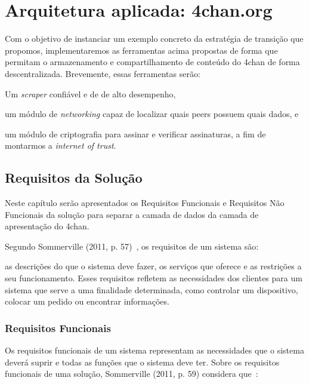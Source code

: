 
\chapter{Arquitetura aplicada: 4chan.org}

Com o objetivo de instanciar um exemplo concreto da estratégia de transição que propomos, implementaremos as ferramentas acima propostas de forma que permitam o armazenamento e compartilhamento de conteúdo do 4chan de forma descentralizada.
Brevemente, essas ferramentas serão:
\begin{enumerate*}[label=(\arabic*)]
    \item Um \textit{scraper} confiável e de de alto desempenho,
    \item um módulo de \textit{networking} capaz de localizar quais peers possuem quais dados, e
    \item um módulo de criptografia para assinar e verificar assinaturas, a fim de montarmos a \textit{internet of trust}. 
\end{enumerate*}

\section{Requisitos da Solução}

Neste capítulo serão apresentados os Requisitos Funcionais e Requisitos Não Funcionais da solução para separar a camada de dados da camada de apresentação do 4chan.

Segundo Sommerville (2011, p. 57)~\cite{SOMMERVILLE1}, os requisitos de um sistema são:

\begin{directcite}
as descrições do que o sistema deve fazer, os serviços que
oferece e as restrições a seu funcionamento.
Esses requisitos refletem as necessidades dos clientes para
um sistema que serve a uma finalidade determinada, como controlar
um dispositivo, colocar um pedido ou encontrar informações.
\end{directcite}

\subsection{Requisitos Funcionais}

Os requisitos funcionais de um sistema representam as necessidades que o sistema deverá suprir e todas as funções que o sistema deve ter.
Sobre os requisitos funcionais de uma solução, Sommerville (2011, p. 59) considera que~\cite{SOMMERVILLE1}:

